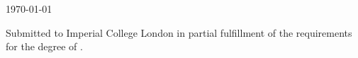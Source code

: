 \begin{titlepage}



{\large \today} %


\vfill %
Submitted to Imperial College London in partial fulfillment of the requirements for the degree of \degreetype.

\end{titlepage}
